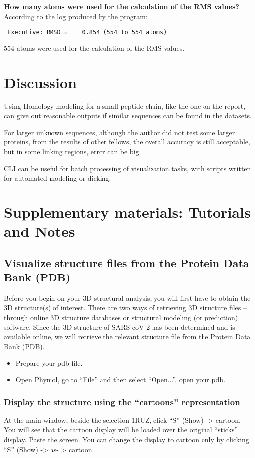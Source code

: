 \documentclass[en,black,12pt,normal]{elegantnote}
\begin{document}
\textbf{How many atoms were used for the calculation of the RMS values?}
According to the log produced by the program:
\begin{lstlisting}
 Executive: RMSD =    0.854 (554 to 554 atoms)
\end{lstlisting}
554 atoms were used for the calculation of the RMS values.


\section{Discussion}

Using Homology modeling for a small peptide chain, like the one on the report, 
can give out reasonable outputs if similar sequences can be found in the datasets.

For larger unknown sequences, although the author did not test some larger proteins,
from the results of other fellows, the overall accuracy is still acceptable, but in
some linking regions, error can be big.

CLI can be useful for batch processing of visualization tasks, with scripts written for automated
modeling or dicking.


\section{Supplementary materials: Tutorials and Notes}

\subsection{Visualize structure files from the Protein Data Bank (PDB)}

Before you begin on your 3D structural analysis, you will first have to obtain the 3D structure(s) of interest. 
There are two ways of retrieving 3D structure files – through online 3D structure databases or structural modeling (or prediction) software. 
Since the 3D structure of SARS-coV-2 has been determined and is available online, we will retrieve the relevant structure file from the Protein Data Bank (PDB).

\begin{itemize}
    \item Prepare your pdb file. 
    \item Open Phymol, go to “File” and then select “Open...”. open your pdb.
\end{itemize}


\subsubsection{Display the structure using the “cartoons” representation}
At the main window, beside the selection 1RUZ, click “S” (Show) -> cartoon. 
You will see that the cartoon display will be loaded over the original “sticks” display. Paste the screen. 
You can change the display to cartoon only by clicking “S” (Show) -> as- > cartoon.
\end{document}
